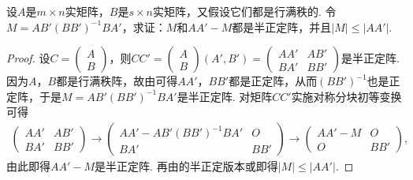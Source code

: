 \documentclass[../../main.tex]{subfiles}
\begin{document}
\begin{example}\label{example:例9.81}
设\(A\)是\(m\times n\)实矩阵，\(B\)是\(s\times n\)实矩阵，又假设它们都是行满秩的. 令\(M = AB'(BB')^{-1}BA'\)，求证：\(M\)和\(AA' - M\)都是半正定阵，并且\(\vert M\vert\leq\vert AA'\vert\).
\end{example}
\begin{proof}
设\(C=\begin{pmatrix}A\\B\end{pmatrix}\)，则\(CC'=\begin{pmatrix}A\\B\end{pmatrix}(A',B')=\begin{pmatrix}AA'&AB'\\BA'&BB'\end{pmatrix}\)是半正定阵. 因为\(A\)，\(B\)都是行满秩阵，故由可得\(AA'\)，\(BB'\)都是正定阵，从而\((BB')^{-1}\)也是正定阵，于是\(M = AB'(BB')^{-1}BA'\)是半正定阵. 对矩阵\(CC'\)实施对称分块初等变换可得
\begin{align*}
\begin{pmatrix}AA'&AB'\\BA'&BB'\end{pmatrix}\to\begin{pmatrix}AA' - AB'(BB')^{-1}BA'&O\\BA'&BB'\end{pmatrix}\to\begin{pmatrix}AA' - M&O\\O&BB'\end{pmatrix},
\end{align*}
由此即得\(AA' - M\)是半正定阵. 再由的半正定版本或即得\(\vert M\vert\leq\vert AA'\vert\).
\end{proof}
\end{document}
